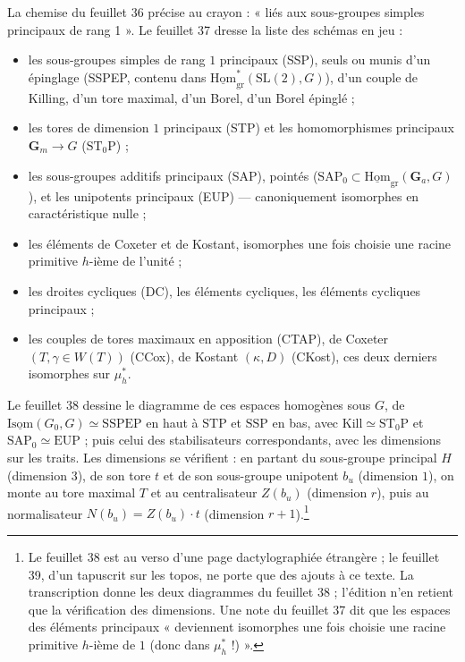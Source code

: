 \documentclass[11pt,a4paper]{article}
\begin{document}
La chemise du feuillet 36 précise au crayon : « liés aux sous-groupes simples
principaux de rang 1 ». Le feuillet 37 dresse la liste des schémas en jeu :

\begin{itemize}
\item les sous-groupes simples de rang $1$ principaux (SSP), seuls ou munis
  d'un épinglage (SSPEP, contenu dans
  $\underline{\mathrm{Hom}}^{*}_{\mathrm{gr}}(\mathrm{SL}(2),G)$), d'un couple
  de Killing, d'un tore maximal, d'un Borel, d'un Borel épinglé ;
\item les tores de dimension $1$ principaux (STP) et les homomorphismes
  principaux $\mathbf{G}_{m}\to G$ ($\mathrm{ST}_{0}\mathrm{P}$) ;
\item les sous-groupes additifs principaux (SAP), pointés
  ($\mathrm{SAP}_{0}\subset\underline{\mathrm{Hom}}_{\mathrm{gr}}(\mathbf{G}_{a},G)$),
  et les unipotents principaux (EUP) — canoniquement isomorphes en
  caractéristique nulle ;
\item les éléments de Coxeter et de Kostant, isomorphes une fois choisie une
  racine primitive $h$-ième de l'unité ;
\item les droites cycliques (DC), les éléments cycliques, les éléments
  cycliques principaux ;
\item les couples de tores maximaux en apposition (CTAP), de Coxeter
  $(T,\gamma\in W(T))$ (CCox), de Kostant $(\kappa,D)$ (CKost), ces deux
  derniers isomorphes sur $\mu_{h}^{*}$.
\end{itemize}

Le feuillet 38 dessine le diagramme de ces espaces homogènes sous $G$, de
$\underline{\mathrm{Isom}}(G_{0},G)\simeq\mathrm{SSPEP}$ en haut à
$\mathrm{STP}$ et $\mathrm{SSP}$ en bas, avec
$\mathrm{Kill}\simeq\mathrm{ST}_{0}\mathrm{P}$ et
$\mathrm{SAP}_{0}\simeq\mathrm{EUP}$ ; puis celui des stabilisateurs
correspondants, avec les dimensions sur les traits. Les dimensions se
vérifient : en partant du sous-groupe principal $H$ (dimension $3$), de son
tore $t$ et de son sous-groupe unipotent $b_{u}$ (dimension $1$), on monte au
tore maximal $T$ et au centralisateur $Z(b_{u})$ (dimension $r$), puis au
normalisateur $N(b_{u})=Z(b_{u})\cdot t$ (dimension $r+1$).\footnote{Le
feuillet 38 est au verso d'une page dactylographiée étrangère ; le
feuillet 39, d'un tapuscrit sur les topos, ne porte que des ajouts à ce texte.
La transcription donne les deux diagrammes du feuillet 38 ; l'édition n'en
retient que la vérification des dimensions. Une note du feuillet 37 dit que les
espaces des éléments principaux « deviennent isomorphes une fois choisie une
racine primitive $h$-ième de $1$ (donc dans $\mu_{h}^{*}$ !) ».}
\end{document}

